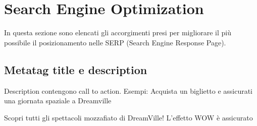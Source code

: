 \section{Search Engine Optimization}
In questa sezione sono elencati gli accorgimenti presi per migliorare il più possibile il posizionamento nelle SERP (Search Engine Response Page).
\subsection{Metatag title e description}

Description contengono call to action. Esempi: Acquista un biglietto e assicurati una giornata spaziale a Dreamville

Scopri tutti gli spettacoli mozzafiato di DreamVille! L'effetto WOW è assicurato